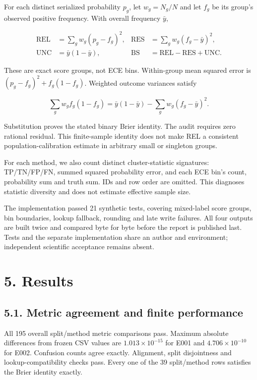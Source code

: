 For each distinct serialized probability \(p_g\), let \(w_g=N_g/N\) and
let \(f_g\) be its group's observed positive frequency. With overall
frequency \(\bar y\),

\[
\begin{aligned}
\mathrm{REL}&=\sum_g w_g(p_g-f_g)^2, &
\mathrm{RES}&=\sum_g w_g(f_g-\bar y)^2,\\
\mathrm{UNC}&=\bar y(1-\bar y), &
\mathrm{BS}&=\mathrm{REL}-\mathrm{RES}+\mathrm{UNC}.
\end{aligned}
\]

These are exact score groups, not ECE bins. Within-group mean squared
error is \((p_g-f_g)^2+f_g(1-f_g)\). Weighted outcome variances satisfy

\[
\sum_g w_g f_g(1-f_g)=\bar y(1-\bar y)-\sum_g w_g(f_g-\bar y)^2.
\]

Substitution proves the stated binary Brier identity. The audit requires
zero rational residual. This finite-sample identity does not make REL a
consistent population-calibration estimate in arbitrary small or
singleton groups.

For each method, we also count distinct cluster-statistic signatures:
TP/TN/FP/FN, summed squared probability error, and each ECE bin's count,
probability sum and truth sum. IDs and row order are omitted. This
diagnoses statistic diversity and does not estimate effective sample
size.

The implementation passed 21 synthetic tests, covering mixed-label score
groups, bin boundaries, lookup fallback, rounding and late write
failures. All four outputs are built twice and compared byte for byte
before the report is published last. Tests and the separate
implementation share an author and environment; independent scientific
acceptance remains absent.

\hypertarget{results}{%
\section{5. Results}\label{results}}

\hypertarget{metric-agreement-and-finite-performance}{%
\subsection{5.1. Metric agreement and finite
performance}\label{metric-agreement-and-finite-performance}}

All 195 overall split/method metric comparisons pass. Maximum absolute
differences from frozen CSV values are \(1.013\times10^{-15}\) for E001
and \(4.706\times10^{-10}\) for E002. Confusion counts agree exactly.
Alignment, split disjointness and lookup-compatibility checks pass.
Every one of the 39 split/method rows satisfies the Brier identity
exactly.

